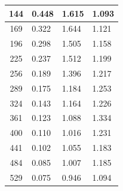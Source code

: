 \documentclass[letterpaper, 10 pt, conference]{ieeeconf}  %
\begin{document}
\begin{figure}
\begin{minipage}[b]{.45\linewidth}
\begin{center}
\begin{tabular}{|c|l|l|l|}
                                144                  & 0.448                               & 1.615                                & 1.093                                 \\ \hline
                                169                  & 0.322                               & 1.644                                & 1.121                                 \\ \hline
                                196                  & 0.298                               & 1.505                                & 1.158                                 \\ \hline
                                225                  & 0.237                               & 1.512                                & 1.199                                 \\ \hline
                                256                  & 0.189                               & 1.396                                & 1.217                                 \\ \hline
                                289                  & 0.175                               & 1.184                                & 1.253                                 \\ \hline
                                324                  & 0.143                               & 1.164                                & 1.226                                 \\ \hline
                                361                  & 0.123                               & 1.088                                & 1.334                                 \\ \hline
                                400                  & 0.110                               & 1.016                                & 1.231                                 \\ \hline
                                441                  & 0.102                               & 1.055                                & 1.183                                 \\ \hline
                                484                  & 0.085                               & 1.007                                & 1.185                                 \\ \hline
                                529                  & 0.075                               & 0.946                                & 1.094                                 \\ \hline

\end{tabular}
\end{center}
\end{minipage}
\end{figure}
\end{document}

